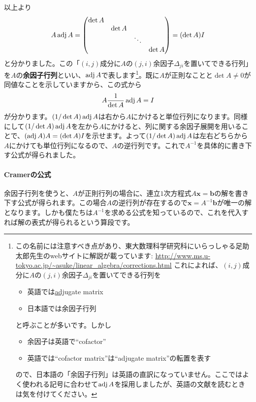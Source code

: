 以上より
\[
A \operatorname{adj} A = 
\begin{pmatrix}
\det A \\
 & \det A \\
 & & \ddots \\
 & & & \det A
\end{pmatrix}
= (\det A) I
\]
と分かりました。この「$(i, j)$成分に$A$の$(j, i)$余因子$\Delta_{ji}$を置いてできる行列」を$A$の\textbf{余因子行列}といい、$\operatorname{adj} A$で表します\footnote{この名前には注意すべき点があり、東大数理科学研究科にいらっしゃる足助太郎先生のwebサイトに解説が載っています: \url{http://www.ms.u-tokyo.ac.jp/~asuke/linear_algebra/corrections.html} これによれば、$(i, j)$成分に$A$の$(j, i)$余因子$\Delta_{ji}$を置いてできる行列を
\begin{itemize}
\item 英語では\uline{adj}ugate matrix
\item 日本語では余因子行列
\end{itemize}
と呼ぶことが多いです。しかし
\begin{itemize}
\item 余因子は英語で``cofactor''
\item 英語では``cofactor matrix''は``adjugate matrix''の転置を表す
\end{itemize}
ので、日本語の「余因子行列」は英語の直訳になっていません。ここではよく使われる記号に合わせて$\operatorname{adj} A$を採用しましたが、英語の文献を読むときは気を付けてください。}。既に$A$が正則なことと$\det A \neq 0$が同値なことを示していますから、この式から
\[
A \frac{1}{\det A} \operatorname{adj} A = I
\]
が分かります。$(1/ \det A) \operatorname{adj} A$は右から$A$にかけると単位行列になります。同様にして$(1 / \det A) \operatorname{adj} A$を左から$A$にかけると、列に関する余因子展開を用いることで、$(\operatorname{adj} A) A = (\det A) I$を示せます。よって$(1 / \det A)\operatorname{adj} A$は左右どちらから$A$にかけても単位行列になるので、$A$の逆行列です。これで$A^{-1}$を具体的に書き下す公式が得られました。

\paragraph{Cramerの公式}

余因子行列を使うと、$A$が正則行列の場合に、連立$1$次方程式$A\bm{x} = \bm{b}$の解を書き下す公式が得られます。この場合$A$の逆行列が存在するので$\bm{x} = A^{-1} \bm{b}$が唯一の解となります。しかも僕たちは$A^{-1}$を求める公式を知っているので、これを代入すれば解の表式が得られるという算段です。

